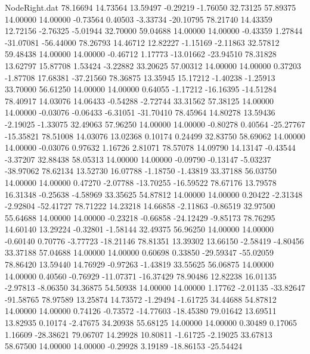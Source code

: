 \begin{filecontents}{NodeRight.dat}
  78.16694   14.73564   13.59497    -0.29219   -1.76050   32.73125   57.89375   14.00000   14.00000   -0.73564    0.40503   -3.33734  -20.10795
  78.21740   14.43359   12.72156    -2.76325   -5.01944   32.70000   59.04688   14.00000   14.00000   -0.43359    1.27844  -31.07081  -56.44000
  78.26793   14.46712   12.82227    -1.15169   -2.11863   32.57812   59.48438   14.00000   14.00000   -0.46712    1.17773  -13.01662  -23.94510
  78.31828   13.62797   15.87708     1.53424   -3.22882   33.20625   57.00312   14.00000   14.00000    0.37203   -1.87708   17.68381  -37.21560
  78.36875   13.35945   15.17212    -1.40238   -1.25913   33.70000   56.61250   14.00000   14.00000    0.64055   -1.17212  -16.16395  -14.51284
  78.40917   14.03076   14.06433    -0.54288   -2.72744   33.31562   57.38125   14.00000   14.00000   -0.03076   -0.06433   -6.31051  -31.70410
  78.45964   14.80278   13.59436    -2.19025   -1.33075   32.49063   57.96250   14.00000   14.00000   -0.80278    0.40564  -25.27767  -15.35821
  78.51008   14.03076   13.02368     0.10174    0.24499   32.83750   58.69062   14.00000   14.00000   -0.03076    0.97632    1.16726    2.81071
  78.57078   14.09790   14.13147    -0.43544   -3.37207   32.88438   58.05313   14.00000   14.00000   -0.09790   -0.13147   -5.03237  -38.97062
  78.62134   13.52730   16.07788    -1.18750   -1.43819   33.37188   56.03750   14.00000   14.00000    0.47270   -2.07788  -13.70255  -16.59522
  78.67176   13.79578   16.31348    -0.25638   -4.58969   33.35625   54.87812   14.00000   14.00000    0.20422   -2.31348   -2.92804  -52.41727
  78.71222   14.23218   14.66858    -2.11863   -0.86519   32.97500   55.64688   14.00000   14.00000   -0.23218   -0.66858  -24.12429   -9.85173
  78.76295   14.60140   13.29224    -0.32801   -1.58144   32.49375   56.96250   14.00000   14.00000   -0.60140    0.70776   -3.77723  -18.21146
  78.81351   13.39302   13.66150    -2.58419   -4.80456   33.37188   57.04688   14.00000   14.00000    0.60698    0.33850  -29.59347  -55.02059
  78.86420   13.59440   14.76929    -0.97263   -1.43819   33.55625   56.06875   14.00000   14.00000    0.40560   -0.76929  -11.07371  -16.37429
  78.90486   12.82238   16.01135    -2.97813   -8.06350   34.36875   54.50938   14.00000   14.00000    1.17762   -2.01135  -33.82647  -91.58765
  78.97589   13.25874   14.73572    -1.29494   -1.61725   34.44688   54.87812   14.00000   14.00000    0.74126   -0.73572  -14.77603  -18.45380
  79.01642   13.69511   13.82935     0.10174   -2.47675   34.20938   55.68125   14.00000   14.00000    0.30489    0.17065    1.16609  -28.38621
  79.06707   14.29928   10.80811    -1.61725   -2.19025   33.67813   58.67500   14.00000   14.00000   -0.29928    3.19189  -18.86153  -25.54424

\end{filecontents}
